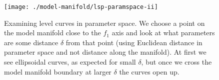 \documentclass[11pt]{article}
\begin{document}
\begin{figure}
  \centering
  \texttt{[image: ./model-manifold/lsp-paramspace-ii]}
  \caption{Examining level curves in parameter space. We choose a
    point on the model manifold close to the $f_1$ axis and look at
    what parameters are some distance $\delta$ from that point (using
    Euclidean distance in parameter space and not distance along the
    manifold). At first we see ellipsoidal curves, as expected for
    small $\delta$, but once we cross the model manifold boundary
    at larger $\delta$ the curves open up. \label{fig:lmm-lc} }
\end{figure}
\end{document}
